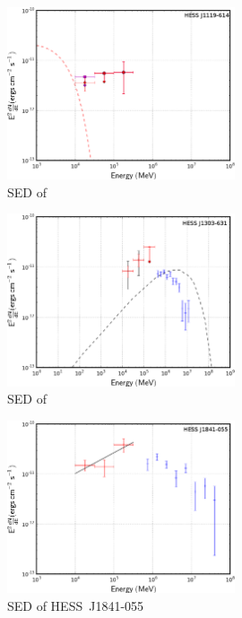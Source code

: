 \begin{figure}[h!]
\centering
\includegraphics[width=0.60\textwidth]{figures/HESSJ1119.eps}
\caption{SED of 
\label{fig:hessj1119}}
\end{figure}



\begin{figure}[h!]
\centering
\includegraphics[width=0.60\textwidth]{figures/HESSJ1303631leptdalton.eps}
\caption{SED of 
\label{fig:hessj1303}}
\end{figure}


\begin{figure}[h!]
\centering
\includegraphics[width=0.60\textwidth]{figures/HESSJ1841055.eps}
\caption{SED of HESS~J1841-055
\label{fig:1841}}
\end{figure}

